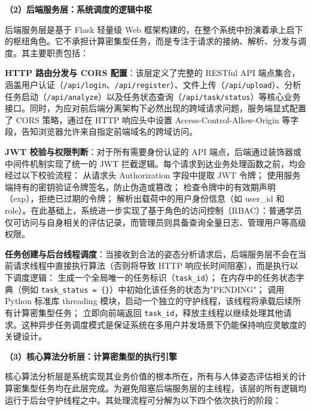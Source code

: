 \textbf{（2）后端服务层：系统调度的逻辑中枢}

后端服务层是基于 Flask 轻量级 Web 框架构建的，在整个系统中扮演着承上启下的枢纽角色。它不承担计算密集型任务，而是专注于请求的接纳、解析、分发与调度。其主要职责包括：

\begin{chineseenum}
  \item \textbf{HTTP 路由分发与 CORS 配置}：该层定义了完整的 RESTful API 端点集合，涵盖用户认证（\texttt{/api/login}、\texttt{/api/register}）、文件上传（\texttt{/api/upload}）、分析任务启动（\texttt{/api/analyze}）以及任务状态查询（\texttt{/api/task/status}）等核心业务接口。同时，为应对前后端分离架构下必然出现的跨域请求问题，服务端显式配置了 CORS 策略，通过在 HTTP 响应头中设置 Access-Control-Allow-Origin 等字段，告知浏览器允许来自指定前端域名的跨域访问。

  \item \textbf{JWT 校验与权限判断}：对于所有需要身份认证的 API 端点，后端通过装饰器或中间件机制实现了统一的 JWT 拦截逻辑。每个请求到达业务处理函数之前，均会经过以下校验流程： 从请求头 Authorization 字段中提取 JWT 令牌； 使用服务端持有的密钥验证令牌签名，防止伪造或篡改； 检查令牌中的有效期声明（exp），拒绝已过期的令牌； 解析出载荷中的用户身份信息（如 user\_id 和 role）。在此基础上，系统进一步实现了基于角色的访问控制（RBAC）：普通学员仅可访问与自身相关的评估记录，而管理员则具备查询全量日志、管理用户等高级权限。

  \item \textbf{任务创建与后台线程调度}：当接收到合法的姿态分析请求后，后端服务层不会在当前请求线程中直接执行算法（否则将导致 HTTP 响应长时间阻塞），而是执行以下调度逻辑： 生成一个全局唯一的任务标识（\texttt{task\_id}）； 在内存中的任务状态字典（例如 \texttt{task\_status = \{\}}）中初始化该任务的状态为"PENDING"； 调用 Python 标准库 threading 模块，启动一个独立的守护线程，该线程将承载后续所有计算密集型任务； 立即向前端返回 \texttt{task\_id}，释放主线程以继续处理其他请求。这种异步任务调度模式是保证系统在多用户并发场景下仍能保持响应灵敏度的关键设计。
\end{chineseenum}

\textbf{（3）核心算法分析层：计算密集型的执行引擎}

核心算法分析层是系统实现其业务价值的根本所在，所有与人体姿态评估相关的计算密集型任务均在此层完成。为避免阻塞后端服务层的主线程，该层的所有逻辑均运行于后台守护线程之中。其处理流程可分解为以下四个依次执行的阶段：

